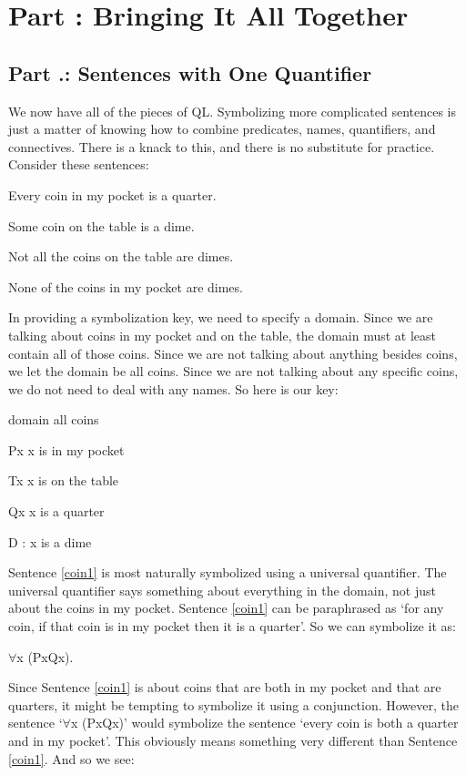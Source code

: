 \setcounter{seccount}{1}
\chapter{Part \thechapcount: Bringing It All Together}
\section{Part \thechapcount.\theseccount: Sentences with One Quantifier}
We now have all of the pieces of QL. Symbolizing more complicated sentences is just a matter of knowing how to combine predicates, names, quantifiers, and connectives. There is a knack to this, and there is no substitute for practice. Consider these sentences:
\begin{earg}
\item[\ex{coin1}] Every coin in my pocket is a quarter.
\item[\ex{coin2}] Some coin on the table is a dime.
\item[\ex{coin3}] Not all the coins on the table are dimes.
\item[\ex{coin4}] None of the coins in my pocket are dimes.
\end{earg}
In providing a symbolization key, we need to specify a domain. Since we are talking about coins in my pocket and on the table, the domain must at least contain all of those coins. Since we are not talking about anything besides coins, we let the domain be all coins. Since we are not talking about any specific coins, we do not need to deal with any names. So here is our key:
\begin{ekey}
\item[domain] all coins
\item[Px]  x is in my pocket
\item[Tx] x is on the table
\item[Qx] x is a quarter
\item[D]: x is a dime
\end{ekey}
Sentence \ref{coin1} is most naturally symbolized using a universal quantifier. The universal quantifier says something about everything in the domain, not just about the coins in my pocket. Sentence \ref{coin1} can be paraphrased as ‘for any coin, if that coin is in my pocket then it is a quarter’. So we can symbolize it as:
\begin{center}
$\forall$x (Px\eif Qx).
\end{center}
Since Sentence \ref{coin1} is about coins that are both in my pocket and that are quarters, it might be tempting to symbolize it using a conjunction. However, the sentence ‘$\forall$x (Px\eand Qx)’ would symbolize the sentence ‘every coin is both a quarter and in my pocket’. This obviously means something very different than Sentence \ref{coin1}. And so we see:
